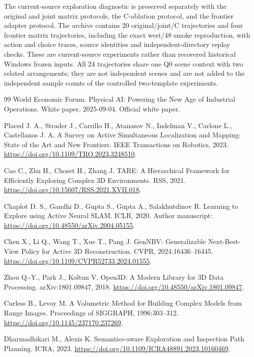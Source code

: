 \documentclass[11pt,a4paper]{article}
\providecommand{\href}[2]{#2}
\begin{document}
The current-source exploration diagnostic is preserved separately with
the original and joint matrix protocols, the C-ablation protocol, and
the frontier adapter protocol. The archive contains 20 original/joint/C
trajectories and four frontier matrix trajectories, including the exact
west/48 smoke reproduction, with action and choice traces, source
identities and independent-directory replay checks. These are
current-source experiments rather than recovered historical Windows
frozen inputs. All 24 trajectories share one Q0 scene context with two
related arrangements; they are not independent scenes and are not added
to the independent sample counts of the controlled two-template
experiments.

\begin{thebibliography}{99}
 World Economic Forum. Physical AI: Powering the New Age of Industrial Operations. White paper, 2025-09-04. \href{https://www.weforum.org/publications/physical-ai-powering-the-new-age-of-industrial-operations/}{Official white paper}.

 Placed J. A., Strader J., Carrillo H., Atanasov N., Indelman V., Carlone L., Castellanos J. A. A Survey on Active Simultaneous Localization and Mapping: State of the Art and New Frontiers. IEEE Transactions on Robotics, 2023. \url{https://doi.org/10.1109/TRO.2023.3248510}.

 Cao C., Zhu H., Choset H., Zhang J. TARE: A Hierarchical Framework for Efficiently Exploring Complex 3D Environments. RSS, 2021. \url{https://doi.org/10.15607/RSS.2021.XVII.018}.

 Chaplot D. S., Gandhi D., Gupta S., Gupta A., Salakhutdinov R. Learning to Explore using Active Neural SLAM. ICLR, 2020. Author manuscript: \url{https://doi.org/10.48550/arXiv.2004.05155}.

 Chen X., Li Q., Wang T., Xue T., Pang J. GenNBV: Generalizable Next-Best-View Policy for Active 3D Reconstruction. CVPR, 2024:16436--16445. \url{https://doi.org/10.1109/CVPR52733.2024.01555}.

 Zhou Q.-Y., Park J., Koltun V. Open3D: A Modern Library for 3D Data Processing. arXiv:1801.09847, 2018. \url{https://doi.org/10.48550/arXiv.1801.09847}.

 Curless B., Levoy M. A Volumetric Method for Building Complex Models from Range Images. Proceedings of SIGGRAPH, 1996:303--312. \url{https://doi.org/10.1145/237170.237269}.

 Dharmadhikari M., Alexis K. Semantics-aware Exploration and Inspection Path Planning. ICRA, 2023. \url{https://doi.org/10.1109/ICRA48891.2023.10160469}.


\end{thebibliography}
\end{document}
